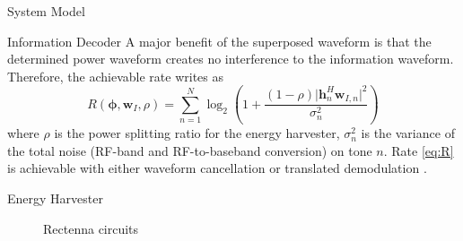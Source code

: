 \documentclass[journal]{IEEEtran}
\begin{document}
\begin{section}{System Model}
		\begin{subsection}{Information Decoder}
			A major benefit of the superposed waveform is that the determined power waveform creates no interference to the information waveform. Therefore, the achievable rate writes as
			\begin{equation}\label{eq:R}
				R(\boldsymbol{\phi},\boldsymbol{w}_I,\rho) = \sum_{n=1}^N{\log_2\left(1+\frac{(1-\rho)\lvert \boldsymbol{h}_{n}^H\boldsymbol{w}_{I,n} \rvert^2}{\sigma_n^2}\right)}
			\end{equation}
			where $\rho$ is the power splitting ratio for the energy harvester, $\sigma_n^2$ is the variance of the total noise (RF-band and RF-to-baseband conversion) on tone $n$. Rate \ref{eq:R} is achievable with either waveform cancellation or translated demodulation \cite{Clerckx2018b}.
		\end{subsection}


		\begin{subsection}{Energy Harvester}
			\begin{figure}[!t]
				\centering
				\noindent
				\begin{minipage}[b]{0.5\linewidth}
					\centering
				\end{minipage}%
				\begin{minipage}[b]{0.5\linewidth}
					\centering
				\end{minipage}
				\caption{Rectenna circuits}
			\end{figure}


\end{subsection}
\end{section}
\end{document}
